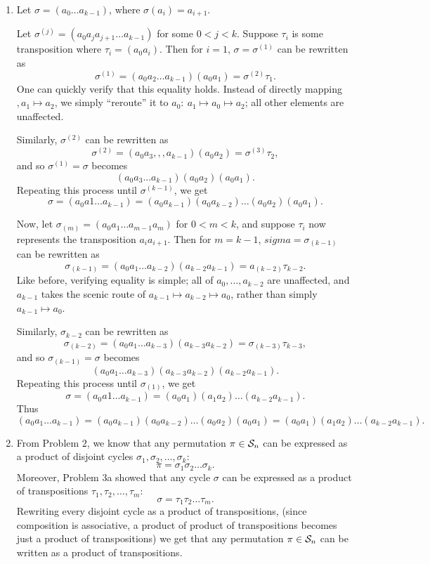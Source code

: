 \documentclass{homework}
\begin{document}
\begin{solution}
  \begin{enumerate}[label=(\alph*)]
    \item Let $\sigma=(a_0\ldots a_{k-1})$, where $\sigma(a_i)=a_{i+1}$.

      Let $\sigma^{(j)}=(a_0a_ja_{j+1}\ldots a_{k-1})$  for some $0<j<k$. Suppose $\tau_i$ is some
      transposition where $ \tau_i=(a_0a_i)$. Then for $i=1$, $\sigma=\sigma^{(1)}$ can be rewritten
      as \[
        \sigma^{(1)}=(a_0a_2\ldots a_{k-1})(a_0a_1)=\sigma^{(2)}\tau_1
      .\] One can quickly verify that this equality holds. Instead of directly mapping $ , a_1\mapsto
      a_2$, we simply ``reroute'' it to $ a_0:\ a_1\mapsto a_0\mapsto a_2$; all other elements are
      unaffected.

      Similarly, $  \sigma^{(2)}$ can be rewritten as \[
        \sigma^{(2)}=(a_0a_3,,, a_{k-1})(a_0a_2)=\sigma^{(3)}\tau_2
      ,\] and so $\sigma^{(1)}=\sigma$ becomes \[
        (a_0a_3... a_{k-1})(a_0a_2)(a_0a_1)
      .\] Repeating this process until $\sigma^{(k-1)}$, we get \[
        \sigma=(a_0a1\ldots a_{k-1})=(a_0a_{k-1})(a_0a_{k-2})\ldots(a_0a_2)(a_0a_1)
      .\]

      Now, let $\sigma_{(m)}=(a_0a_1\ldots a_{m-1}a_{m})$ for $0<m<k$, and suppose $\tau_i$ now
      represents the transposition $a_ia_{i+1}$. Then for $m=k-1$, $sigma=\sigma_{(k-1)}$ can be
      rewritten as \[
        \sigma_{(k-1)}=(a_0a_1\ldots a_{k-2})(a_{k-2}a_{k-1})=a_{(k-2)}\tau_{k-2}
      .\] Like before, verifying equality is simple; all of $a_0,\ldots,a_{k-2}$ are unaffected, and
      $a_{k-1}$ takes the scenic route of $a_{k-1}\mapsto a_{k-2}\mapsto a_0$, rather than simply
      $a_{k-1}\mapsto a_0$.

      Similarly, $\sigma_{k-2}$  can be rewritten as \[
        \sigma_{(k-2)}=(a_0a_1\ldots a_{k-3})(a_{k-3}a_{k-2})=\sigma_{(k-3)}\tau_{k-3}
      ,\] and so $\sigma_{(k-1)}=\sigma $ becomes \[
      (a_0a_1\ldots a_{k-3})(a_{k-3}a_{k-2})(a_{k-2}a_{k-1})
    .\] Repeating this process until $\sigma_{(1)}$, we get \[
        \sigma = (a_0a1\ldots a_{k-1})=(a_0a_1)(a_1a_2)\ldots(a_{k-2}a_{k-1})
      .\] Thus \[
        (a_0a_1\ldots
          a_{k-1})=(a_0a_{k-1})(a_0a_{k-2})\ldots(a_0a_2)(a_0a_1)=(a_0a_1)(a_1a_2)\ldots(a_{k-2}a_{k-1})
      .\] 

    \item From Problem $2$, we know that any permutation $\pi\in \mathcal{S}_n$ can be expressed as a
      product of disjoint cycles $\sigma_1,\sigma_2,\ldots,\sigma_k$: \[
        \pi = \sigma_1\sigma_2\ldots\sigma_k
      .\] Moreover, Problem 3a showed that any cycle $\sigma$ can be expressed as a product of
      transpositions $\tau_1,\tau_2,\ldots,\tau_m$: \[
        \sigma=\tau_1\tau_2\ldots\tau_m
      .\] Rewriting every disjoint cycle as a product of transpositions, (since composition is
      associative, a product of product of transpositions becomes just a product of transpositions)
      we get that any permutation $\pi\in \mathcal{S}_n$ can be written as a product of transpositions.


\end{enumerate}
\end{solution}
\end{document}
